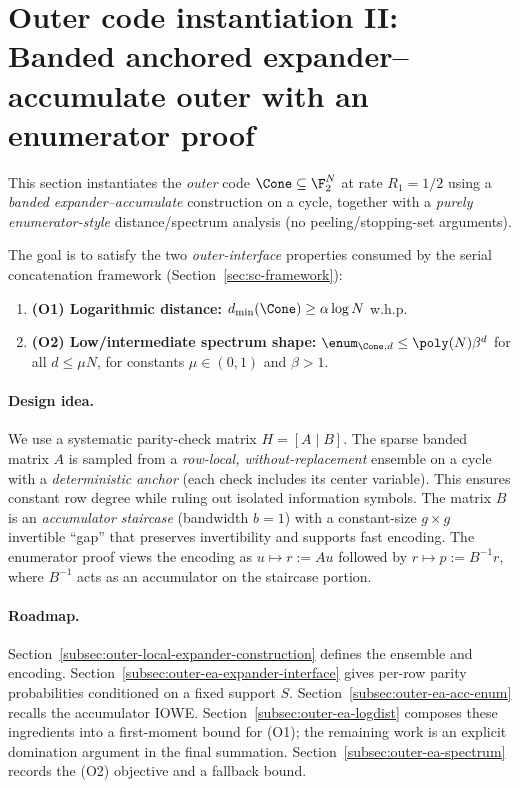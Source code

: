 \section{Outer code instantiation II: Banded anchored expander--accumulate outer with an enumerator proof}
\label{sec:outer-local-expander}

This section instantiates the \emph{outer} code $\Cone\subseteq\F_2^{N}$ at rate $R_1=1/2$ using a
\emph{banded expander--accumulate} construction on a cycle, together with a \emph{purely enumerator-style}
distance/spectrum analysis (no peeling/stopping-set arguments).

The goal is to satisfy the two \emph{outer-interface} properties consumed by the serial concatenation
framework (Section~\ref{sec:sc-framework}):
\begin{enumerate}
\item \textbf{(O1) Logarithmic distance:} $d_{\min}(\Cone)\ge \alpha\log N$ w.h.p.
\item \textbf{(O2) Low/intermediate spectrum shape:} $\enum_{\Cone,d}\le \poly(N)\beta^{d}$ for all $d\le \mu N$,
      for constants $\mu\in(0,1)$ and $\beta>1$.
\end{enumerate}

\paragraph{Design idea.}
We use a systematic parity-check matrix $H=[A\mid B]$.
The sparse banded matrix $A$ is sampled from a \emph{row-local, without-replacement} ensemble on a cycle with a
\emph{deterministic anchor} (each check includes its center variable). This ensures constant row degree while ruling out
isolated information symbols.
The matrix $B$ is an \emph{accumulator staircase} (bandwidth $b=1$) with a constant-size $g\times g$ invertible ``gap''
that preserves invertibility and supports fast encoding.
The enumerator proof views the encoding as $u\mapsto r:=Au$ followed by $r\mapsto p:=B^{-1}r$, where $B^{-1}$ acts as an
accumulator on the staircase portion.

\paragraph{Roadmap.}
Section~\ref{subsec:outer-local-expander-construction} defines the ensemble and encoding.
Section~\ref{subsec:outer-ea-expander-interface} gives per-row parity probabilities conditioned on a fixed support $S$.
Section~\ref{subsec:outer-ea-acc-enum} recalls the accumulator IOWE.
Section~\ref{subsec:outer-ea-logdist} composes these ingredients into a first-moment bound for (O1); the remaining work is
an explicit domination argument in the final summation.
Section~\ref{subsec:outer-ea-spectrum} records the (O2) objective and a fallback bound.

